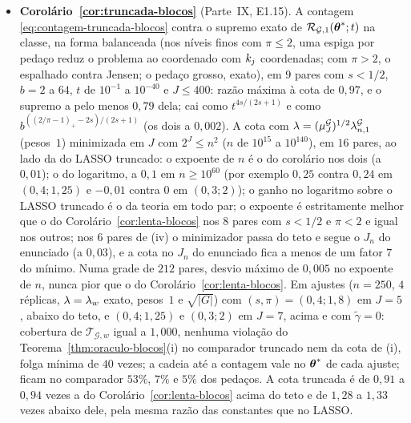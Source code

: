 \documentclass[11pt,a4paper]{article}
\newcommand{\lmaxx}{\lambda_{\max}}
\newcommand{\gtil}{\widetilde{\gamma}}
\newcommand{\Gcal}{\mathcal{G}}
\newcommand{\lamG}{\lambda^{\mathcal{G}}_{n}}
\newcommand{\lamGone}{\lambda^{\mathcal{G}}_{n,1}}
\newcommand{\lamGp}{\lambda^{\mathcal{G},+}_{n}}   %
\newcommand{\Tw}{\mathcal{T}_{\mathcal{G},w}}
\begin{document}
\begin{itemize}[nosep, leftmargin=*]
    e $\lmaxx(\Gramhat) \le \Lambda\mu^{\Gcal}_{J}$ em toda réplica (razões
    máximas $0{,}23$ e $0{,}035$; $c_{\mu} = 153$), $\pen_{w} \le \lamGp$ e
    cobertura de $\Tw$ igual a $1{,}000$ nos dois pesos; $\lmaxx(\Gramhat)$
    mediano vai de $2{,}4\Lambda$ a $14{,}7\Lambda$. Em ajustes ($n = 250$,
    $\pen = \pen_{w}$ exato, $4$ réplicas, os dois pesos) com $(s,\pi) =
    (0{,}6;1)$ em $J = 8$, $(0{,}4;1{,}25)$ e $(0{,}5;1{,}2)$ em $J = 7$, todos
    com $d > n$ e $\gtil = 0$: cobertura $1{,}000$, nenhuma violação do
    Teorema~\ref{thm:oraculo-blocos}(i) nem de \eqref{eq:lenta-nao-assint},
    folga mínima de $61$ vezes.
  \item \textbf{Corolário~\ref{cor:truncada-blocos}} (Parte~IX, E1.15). A
    contagem \eqref{eq:contagem-truncada-blocos} contra o supremo exato de
    $\mathcal{R}_{\Gcal,1}(\thetastar;t)$ na classe, na forma balanceada (nos
    níveis finos com $\pi \le 2$, uma espiga por pedaço reduz o problema ao
    coordenado com $k_{j}$ coordenadas; com $\pi > 2$, o espalhado contra
    Jensen; o pedaço grosso, exato), em $9$ pares com $s < 1/2$, $b = 2$ a
    $64$, $t$ de $10^{-1}$ a $10^{-40}$ e $J \le 400$: razão máxima à cota de
    $0{,}97$, e o supremo a pelo menos $0{,}79$ dela; cai como $t^{4s/(2s+1)}$ e
    como $b^{((2/\pi-1)_{+}-2s)/(2s+1)}$ (os dois a $0{,}002$). A cota com
    $\pen = (\mu^{\Gcal}_{J})^{1/2}\lamGone$ (pesos~$1$) minimizada em $J$ com
    $2^{J} \le n^{2}$ ($n$ de $10^{15}$ a $10^{140}$), em $16$ pares, ao lado da
    do LASSO truncado: o expoente de $n$ é o do corolário nos dois (a $0{,}01$);
    o do logaritmo, a $0{,}1$ em $n \ge 10^{60}$ (por exemplo $0{,}25$ contra
    $0{,}24$ em $(0{,}4;1{,}25)$ e $-0{,}01$ contra $0$ em $(0{,}3;2)$); o ganho
    no logaritmo sobre o LASSO truncado é o da teoria em todo par; o expoente é
    estritamente melhor que o do Corolário~\ref{cor:lenta-blocos} nos $8$
    pares com $s < 1/2$ e $\pi < 2$ e igual nos outros; nos $6$ pares de (iv)
    o minimizador passa do teto e segue o $J_{n}$ do enunciado (a $0{,}03$), e
    a cota no $J_{n}$ do enunciado fica a menos de um fator $7$ do mínimo. Numa
    grade de $212$ pares, desvio máximo de $0{,}005$ no expoente de $n$, nunca
    pior que o do Corolário~\ref{cor:lenta-blocos}. Em ajustes ($n = 250$, $4$
    réplicas, $\pen = \pen_{w}$ exato, pesos~$1$ e $\sqrt{|G|}$) com
    $(s,\pi) = (0{,}4;1{,}8)$ em $J = 5$, abaixo do teto, e $(0{,}4;1{,}25)$ e
    $(0{,}3;2)$ em $J = 7$, acima e com $\gtil = 0$: cobertura de $\Tw$ igual
    a $1{,}000$, nenhuma violação do Teorema~\ref{thm:oraculo-blocos}(i) no
    comparador truncado nem da cota de (i), folga mínima de $40$ vezes; a
    cadeia até a contagem vale no $\boldsymbol{\theta}^{*}$ de cada ajuste; ficam no
    comparador $53\%$, $7\%$ e $5\%$ dos pedaços. A cota truncada é de
    $0{,}91$ a $0{,}94$ vezes a do Corolário~\ref{cor:lenta-blocos} acima do
    teto e de $1{,}28$ a $1{,}33$ vezes abaixo dele, pela mesma razão das
    constantes que no LASSO.
\end{itemize}
\end{document}
